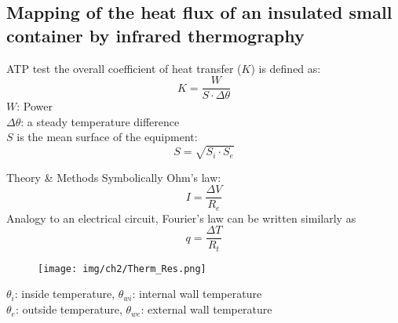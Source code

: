 \subsection{Mapping of the heat flux of an insulated small container by infrared thermography}

\begin{frame}{ATP test}
    the overall coefficient of heat transfer ($K$) is defined as:
    \begin{equation*}
        K = \frac{W}{S\cdot \Delta \theta}
    \end{equation*}
    $W$: Power \\
    $\Delta \theta$: a  steady  temperature  difference\\
    $S$ is the mean surface of the equipment:
    \begin{equation*}
        S = \sqrt{S_i \cdot S_e}
    \end{equation*}
\end{frame}


\begin{frame}{Theory \& Methods}
    Symbolically Ohm’s law:
    \begin{equation*}
        I = \frac{\Delta V}{R_e}
    \end{equation*}
    \pause
    Analogy to an electrical circuit, Fourier’s law can be written similarly as
    \begin{equation*}
        q = \frac{\Delta T}{R_t}
    \end{equation*}

    \pause
    \begin{figure}
        \centering
        \texttt{[image: img/ch2/Therm\_Res.png]}
    \end{figure}

    \centering
    \begin{minipage}[c]{0.8\textwidth}
        $\theta_i$: inside temperature,  $\theta_{wi}$: internal wall temperature\\
        $\theta_e$: outside temperature, $\theta_{we}$: external wall temperature
    \end{minipage}

\end{frame}


